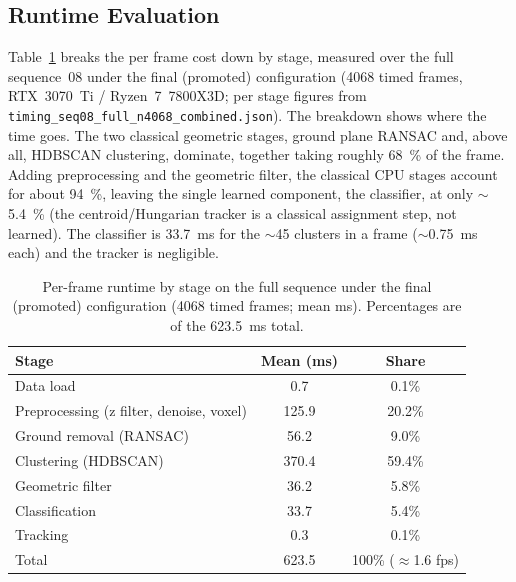 \documentclass[a4paper,12pt]{report}
\begin{document}

\subsection{Runtime Evaluation}
\label{sec:results-runtime}

Table~\ref{tab:runtime} breaks the per frame cost down by stage, measured over
the full sequence~08 under the final (promoted) configuration
(\num{4068} timed frames, RTX~3070~Ti / Ryzen~7~7800X3D;
per stage figures from \texttt{timing\_seq08\_full\_n4068\_combined.json}). The breakdown shows where
the time goes. The two classical geometric stages, ground plane RANSAC and,
above all, HDBSCAN clustering, dominate, together taking roughly
\SI{68}{\percent} of the frame. Adding preprocessing and the geometric filter,
the classical CPU stages account for about \SI{94}{\percent}, leaving the single
learned component, the classifier, at only $\sim$\SI{5.4}{\percent} (the
centroid/Hungarian tracker is a classical assignment step, not learned). The
classifier is \SI{33.7}{\milli\second} for the $\sim$\num{45} clusters in a frame
($\sim$\SI{0.75}{\milli\second} each) and the tracker is negligible.

\begin{table}[H]
  \centering
  \caption[Per frame runtime by stage]{Per-frame runtime by stage on the full
    sequence under the final (promoted) configuration (\num{4068} timed frames; mean ms).
    Percentages are of the \SI{623.5}{\milli\second} total.}
  \label{tab:runtime}
  \begin{tabular}{lcc}
    \toprule
    Stage & Mean (ms) & Share \\
    \midrule
    Data load                       & 0.7   & 0.1\% \\
    Preprocessing (z filter, denoise, voxel) & 125.9 & 20.2\% \\
    Ground removal (RANSAC)         & 56.2  & 9.0\% \\
    Clustering (HDBSCAN)            & 370.4 & 59.4\% \\
    Geometric filter                & 36.2  & 5.8\% \\
    Classification                  & 33.7  & 5.4\% \\
    Tracking                        & 0.3   & 0.1\% \\
    \midrule
    Total                           & 623.5 & 100\% ($\approx$1.6 fps) \\
    \bottomrule
  \end{tabular}
\end{table}
\end{document}

